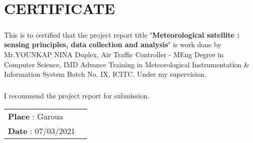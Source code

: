 \chapter*{\normalsize{\textbf{CERTIFICATE}}}
\paragraph{}
This is to certified that the project report title "\textbf{Meteorological satellite :  sensing principles, data collection and analysis}" is work done by Mr.YOUNKAP NINA Duplex,  Air Traffic Controller - MEng Degree in Computer Science, IMD Advance Training in Meteorological Instrumentation \& Information System Batch No. IX, ICITC. Under my supervision.
\paragraph{}
I recommend the project report for submission.
\vspace{10\baselineskip}
\begin{flushleft}
	\begin{tabular}{ll} 
	\textbf{Place }:			Garoua &  \\
	\vspace{ 3\baselineskip}
	\textbf{Date } :			07/03/2021 & \\
	\end{tabular}
\end{flushleft}


